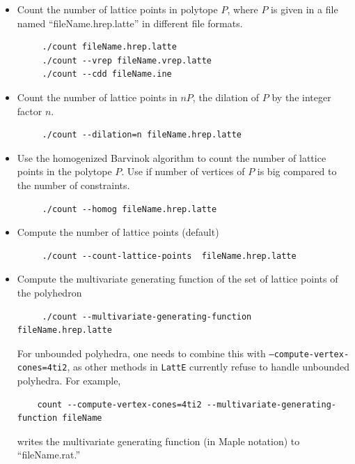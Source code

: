 \documentclass{article}
\newcommand{\latte}{{\tt LattE}\xspace}
\begin{document}
\begin{itemize}
\item Count the number of lattice points in polytope $P$, where $P$  is given in a file named ``fileName.hrep.latte'' in different file formats.
	\begin{verbatim}
     ./count fileName.hrep.latte
     ./count --vrep fileName.vrep.latte
     ./count --cdd fileName.ine
	\end{verbatim} 

\item Count the number of lattice points in $nP$, the dilation of $P$ by the integer factor $n$.
	\begin{verbatim}
     ./count --dilation=n fileName.hrep.latte
	\end{verbatim} 

\item Use the homogenized Barvinok algorithm \cite{latte3} to count  the number of lattice points in the polytope $P$. Use if number of vertices of $P$ is big compared to the number of constraints. 
	\begin{verbatim}
     ./count --homog fileName.hrep.latte
	\end{verbatim} 
\item Compute the number of lattice points (default)
	\begin{verbatim}
     ./count --count-lattice-points  fileName.hrep.latte
	\end{verbatim} 
\item Compute the multivariate generating function of the set of lattice points of the polyhedron
	\begin{verbatim}
     ./count --multivariate-generating-function  fileName.hrep.latte
	\end{verbatim} 
For unbounded polyhedra, one needs to combine
  this with {\tt --compute-vertex-cones=4ti2}, as other methods in \latte currently refuse to handle unbounded polyhedra. For example, 
	\begin{verbatim}
  	count --compute-vertex-cones=4ti2 --multivariate-generating-function fileName
	\end{verbatim}
  writes the multivariate generating function (in Maple notation) to ``fileName.rat.''
	

\end{itemize}
\end{document}
